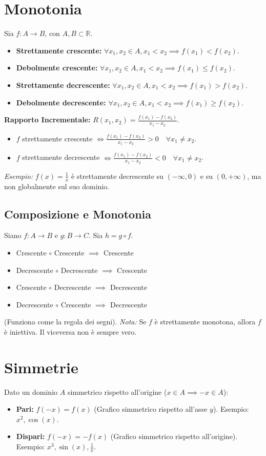 \documentclass{article}
\begin{document}
\section*{Monotonia}
Sia $f: A \to B$, con $A, B \subset \mathbb{R}$.
\begin{itemize}
    \item \textbf{Strettamente crescente:} $\forall x_1, x_2 \in A, x_1 < x_2 \implies f(x_1) < f(x_2)$.
    \item \textbf{Debolmente crescente:} $\forall x_1, x_2 \in A, x_1 < x_2 \implies f(x_1) \le f(x_2)$.
    \item \textbf{Strettamente decrescente:} $\forall x_1, x_2 \in A, x_1 < x_2 \implies f(x_1) > f(x_2)$.
    \item \textbf{Debolmente decrescente:} $\forall x_1, x_2 \in A, x_1 < x_2 \implies f(x_1) \ge f(x_2)$.
\end{itemize}

\textbf{Rapporto Incrementale:}
$R(x_1, x_2) = \frac{f(x_1) - f(x_2)}{x_1 - x_2}$.
\begin{itemize}
    \item $f$ strettamente crescente $\iff \frac{f(x_1) - f(x_2)}{x_1 - x_2} > 0 \quad \forall x_1 \neq x_2$.
    \item $f$ strettamente decrescente $\iff \frac{f(x_1) - f(x_2)}{x_1 - x_2} < 0 \quad \forall x_1 \neq x_2$.
\end{itemize}
\textit{Esempio:} $f(x) = \frac{1}{x}$ è strettamente decrescente su $(-\infty, 0)$ e su $(0, +\infty)$, ma non globalmente sul suo dominio.

\subsection*{Composizione e Monotonia}
Siano $f: A \to B$ e $g: B \to C$. Sia $h = g \circ f$.
\begin{itemize}
    \item Crescente $\circ$ Crescente $\implies$ Crescente
    \item Decrescente $\circ$ Decrescente $\implies$ Crescente
    \item Crescente $\circ$ Decrescente $\implies$ Decrescente
    \item Decrescente $\circ$ Crescente $\implies$ Decrescente
\end{itemize}
(Funziona come la regola dei segni).
\textit{Nota:} Se $f$ è strettamente monotona, allora $f$ è iniettiva. Il viceversa non è sempre vero.

\section*{Simmetrie}
Dato un dominio $A$ simmetrico rispetto all'origine ($x \in A \implies -x \in A$):
\begin{itemize}
    \item \textbf{Pari:} $f(-x) = f(x)$ (Grafico simmetrico rispetto all'asse $y$). Esempio: $x^2, \cos(x)$.
    \item \textbf{Dispari:} $f(-x) = -f(x)$ (Grafico simmetrico rispetto all'origine). Esempio: $x^3, \sin(x), \frac{1}{x}$.
\end{itemize}
\end{document}
